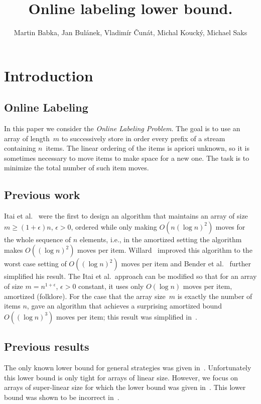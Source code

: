 \documentclass{llncs}
\author{Martin Babka, Jan Bulánek, Vladimír Čunát, Michal Koucký, Michael Saks}
\title{Online labeling lower bound.}
\renewcommand{\theequation}{\arabic{chapter}.\arabic{definition}}
\begin{document}
\renewcommand{\theequation}{\arabic{equation}}


\section{Introduction}
\subsection{Online Labeling}
In this paper we consider the {\em Online Labeling Problem}.
The goal is to use an array of length~$m$ to successively store in order every prefix of a stream containing $n$~items.
The linear ordering of the items is apriori unknown, so it is sometimes necessary to move items to make space for a new one.
The task is to minimize the total number of such item moves.

\subsection{Previous work}
Itai et al.~\cite{Itaietal} were the first to design an algorithm that maintains an array of size $m \ge (1+\epsilon)n$, $\epsilon>0$, ordered while only making $O(n (\log n)^2)$ moves for the whole sequence of $n$ elements, i.e., in the amortized setting the algorithm makes $O((\log n)^2)$ moves per item.
Willard~\cite{Willard} improved this algorithm to the worst case setting of $O((\log n)^2)$ moves per item and Bender et al.~\cite{Benderetal} further simplified his result.
The Itai et al.~approach can be modified so that for an array of
size $m=n^{1+\epsilon}$, $\epsilon>0$ constant, it uses only $O(\log n)$ moves per item,
amortized (folklore). For the case that the array size~$m$ is exactly the number of items $n$,
\cite{Zhang} gave an algorithm that achieves a surprising amortized bound $O((\log n)^3)$ moves per
item; this result was simplified in~\cite{BirdSadnicki}.

\subsection{Previous results}
The only known lower bound for general strategies was given in~\cite{Bulaneketal}.
Unfortunately this lower bound is only tight for arrays of linear size.
However, we focus on arrays of super-linear size for which the lower bound was given in~\cite{Dietz-SIAM}.
This lower bound was shown to be incorrect in~\cite{Bulaneketal}.
\end{document}
